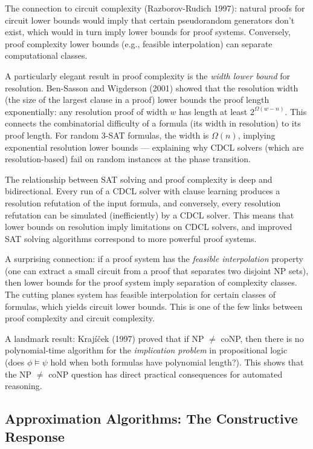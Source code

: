 The connection to circuit complexity (Razborov-Rudich 1997): natural proofs for circuit lower bounds would imply that certain pseudorandom generators don't exist, which would in turn imply lower bounds for proof systems. Conversely, proof complexity lower bounds (e.g., feasible interpolation) can separate computational classes.

A particularly elegant result in proof complexity is the \emph{width lower bound} for resolution. Ben-Sasson and Wigderson (2001) showed that the resolution width (the size of the largest clause in a proof) lower bounds the proof length exponentially: any resolution proof of width $w$ has length at least $2^{\Omega(w - n)}$. This connects the combinatorial difficulty of a formula (its width in resolution) to its proof length. For random 3-SAT formulas, the width is $\Omega(n)$, implying exponential resolution lower bounds — explaining why CDCL solvers (which are resolution-based) fail on random instances at the phase transition.

The relationship between SAT solving and proof complexity is deep and bidirectional. Every run of a CDCL solver with clause learning produces a resolution refutation of the input formula, and conversely, every resolution refutation can be simulated (inefficiently) by a CDCL solver. This means that lower bounds on resolution imply limitations on CDCL solvers, and improved SAT solving algorithms correspond to more powerful proof systems.

A surprising connection: if a proof system has the \emph{feasible interpolation} property (one can extract a small circuit from a proof that separates two disjoint NP sets), then lower bounds for the proof system imply separation of complexity classes. The cutting planes system has feasible interpolation for certain classes of formulas, which yields circuit lower bounds. This is one of the few links between proof complexity and circuit complexity.

A landmark result: Krajíček (1997) proved that if NP $\neq$ coNP, then there is no polynomial-time algorithm for the \emph{implication problem} in propositional logic (does $\phi \models \psi$ hold when both formulas have polynomial length?). This shows that the NP $\neq$ coNP question has direct practical consequences for automated reasoning.

\subsection{Approximation Algorithms: The Constructive Response}
\label{sec:np:approx}

